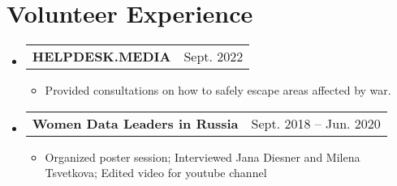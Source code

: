 \documentclass[letterpaper,11pt]{article}
\makeatletter
\newcommand{\myuline}[1]{%
  \uline{\phantom{#1}}%
  \llap{\contour{white}{#1}}%
}
\newcommand{\MYhref}[2]{
\myuline{\href{#1}{{#2}}}
}%
\newcommand{\resumeItem}[1]{
  \item\small{
    {#1 \vspace{-1pt}}
  }
}
\newcommand{\resumeProjectHeading}[2]{
    \item
    \begin{tabular*}{\textwidth}[t]{l@{\extracolsep{\fill}}r}
    \textbf{#1} & {\color{dark-grey}\small #2}\vspace{1pt}\\ %
    \end{tabular*}\vspace{-4pt}
}
\newcommand{\resumeSubHeadingListStart}{\begin{itemize}[leftmargin=0in, label={}]}
\newcommand{\resumeSubHeadingListEnd}{\end{itemize}}
\newcommand{\resumeItemListStart}{\begin{itemize}[label={-}]}
\newcommand{\resumeItemListEnd}{\end{itemize}\vspace{0pt}}
\makeatother
\begin{document}
          
          


\section{Volunteer Experience}
    \resumeSubHeadingListStart
      \resumeProjectHeading
        {HELPDESK.MEDIA} {Sept. 2022} 
          \resumeItemListStart
            \resumeItem{Provided consultations on how to safely escape areas affected by war.}
          \resumeItemListEnd
        \resumeProjectHeading
        {Women Data Leaders in Russia} {Sept. 2018 -- Jun. 2020}
          \resumeItemListStart
            \resumeItem{Organized poster session; Interviewed Jana Diesner and Milena Tsvetkova; Edited video for youtube channel}
          \resumeItemListEnd
    \resumeSubHeadingListEnd

%
\end{document}
